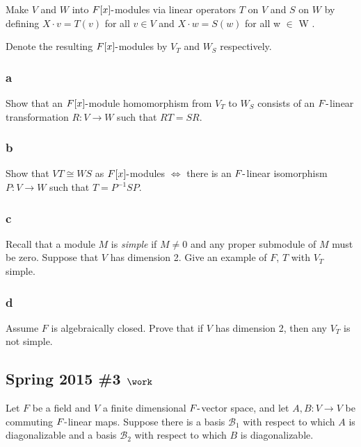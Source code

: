 Make \(V\) and \(W\) into \(F[x]{\hbox{-}}\)modules via linear operators
\(T\) on \(V\) and \(S\) on \(W\) by defining \(X \cdot v = T (v)\) for
all \(v \in V\) and \(X \cdot w = S(w)\) for all w \(\in\) W .

Denote the resulting \(F[x]{\hbox{-}}\)modules by \(V_T\) and \(W_S\)
respectively.

\hypertarget{a-96}{%
\subsubsection{a}\label{a-96}}

Show that an \(F[x]{\hbox{-}}\)module homomorphism from \(V_T\) to
\(W_S\) consists of an \(F{\hbox{-}}\)linear transformation
\(R : V \to W\) such that \(RT = SR\).

\hypertarget{b-86}{%
\subsubsection{b}\label{b-86}}

Show that \(VT \cong WS\) as \(F[x]{\hbox{-}}\)modules \(\iff\) there is
an \(F{\hbox{-}}\)linear isomorphism \(P : V \to W\) such that
\(T = P^{-1}SP\).

\hypertarget{c-56}{%
\subsubsection{c}\label{c-56}}

Recall that a module \(M\) is \emph{simple} if \(M \neq 0\) and any
proper submodule of \(M\) must be zero. Suppose that \(V\) has dimension
2. Give an example of \(F\), \(T\) with \(V_T\) simple.

\hypertarget{d-16}{%
\subsubsection{d}\label{d-16}}

Assume \(F\) is algebraically closed. Prove that if \(V\) has dimension
2, then any \(V_T\) is not simple.

\hypertarget{spring-2015-3-work}{%
\subsection{\texorpdfstring{Spring 2015 \#3
\(\work\)}{Spring 2015 \#3 \textbackslash work}}\label{spring-2015-3-work}}

Let \(F\) be a field and \(V\) a finite dimensional
\(F{\hbox{-}}\)vector space, and let \(A, B: V\to V\) be commuting
\(F{\hbox{-}}\)linear maps. Suppose there is a basis \({\mathcal{B}}_1\)
with respect to which \(A\) is diagonalizable and a basis
\({\mathcal{B}}_2\) with respect to which \(B\) is diagonalizable.

